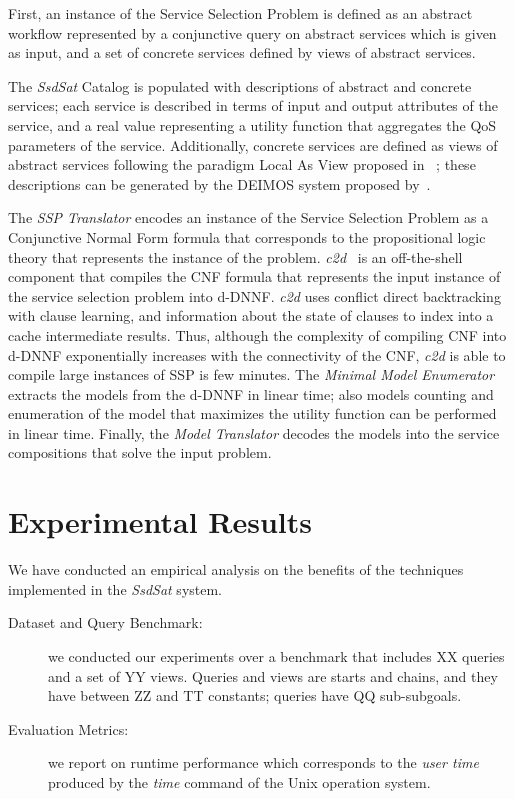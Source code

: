 \documentclass{llncs}
\begin{document}
First, an instance of the Service Selection Problem is defined as an abstract workflow represented by a conjunctive query on abstract services which is given as input, and a set of concrete services defined by views of abstract services. 

The {\it SsdSat}  Catalog is populated with descriptions of abstract and concrete services; each service is described in terms of input and output attributes of the service, and a real value representing a utility function that aggregates the QoS parameters of the service. Additionally, concrete services are defined as views of abstract services following the paradigm Local As View proposed in ~\cite{levy:bucket}; these descriptions can be generated by the {\cal DEIMOS} system proposed by~\cite{AmbiteISWC09}. 

The {\it SSP Translator} encodes an instance of the Service Selection Problem as a Conjunctive Normal Form formula that corresponds to the propositional logic theory that represents the instance of the problem.  {\it c2d}~\cite{c2d} is an off-the-shell component that compiles  the CNF formula that represents the input instance of the service selection problem into  d-DNNF. {\it c2d} uses conflict direct backtracking with clause learning, and information about the state of clauses to  index into a cache intermediate results. Thus, although the complexity of  compiling CNF into d-DNNF exponentially increases  with the connectivity  of the  CNF, {\it c2d} is able to compile large instances of SSP is few minutes. The {\it Minimal Model Enumerator} extracts the models from  the d-DNNF in linear time; also models counting and enumeration of the model that maximizes the utility function can be performed in linear time. Finally, 
the {\it Model Translator} decodes the models into the service compositions that solve the input problem.





\section{Experimental Results}
We have conducted an empirical analysis  on the benefits of the techniques implemented in the  {\it SsdSat} system.

\begin{description}
\item[Dataset and Query Benchmark:]  we conducted our experiments over a benchmark that includes XX queries and a set of  YY views. Queries and views are starts and chains, and they have between ZZ and TT constants; queries have QQ sub-subgoals.
\item[Evaluation Metrics:] we report on runtime performance which corresponds to the  {\it user time} produced by the {\it time} command of the Unix operation system. 
\end{description}
 
\end{document}
